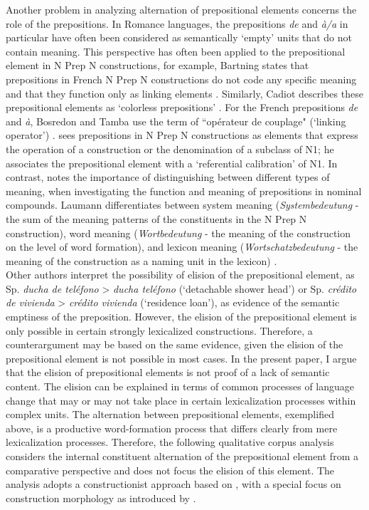 \documentclass[output=paper]{langsci/langscibook}
\begin{document}
Another problem in analyzing alternation of prepositional elements concerns the role of the prepositions. In Romance languages, the prepositions \textit{de} and \textit{à/a} in particular have often been considered as semantically `empty' units that do not contain meaning. This perspective has often been applied to the prepositional element in N Prep N constructions, for example, Bartning states that prepositions in French N Prep N constructions do not code any specific meaning and that they function only as linking elements \citep[164]{Bartning:1993}. Similarly, Cadiot describes these prepositional elements as `colorless prepositions' \citep[164]{Bartning:1993}. For the French prepositions \textit{de} and \textit{à}, Bosredon and Tamba use the term of ``opérateur de couplage" (`linking operator') \citep[44]{Bosredon:1991}. \citet{Cadiot:1997} sees prepositions in N Prep N constructions as elements that express the operation of a construction or the denomination of a subclass of N1; he associates the prepositional element with a `referential calibration' of N1. In contrast, \citet{Laumann:1998} notes the importance of distinguishing between different types of meaning, when investigating the function and meaning of prepositions in nominal compounds. Laumann differentiates between system meaning (\textit{Systembedeutung} - the sum of the meaning patterns of the constituents in the N Prep N construction), word meaning (\textit{Wortbedeutung} - the meaning of the construction on the level of word formation), and lexicon meaning (\textit{Wortschatzbedeutung} - the meaning of the construction as a naming unit in the lexicon) \citep[32]{Laumann:1998}.\\

Other authors interpret the possibility of elision of the prepositional element, as Sp. \textit{ducha de teléfono}  > \textit{ducha teléfono} (`detachable shower head') or Sp.  \textit{crédito de vivienda} > \textit{crédito  vivienda} (`residence loan'), as evidence of the semantic emptiness of the preposition. However, the elision of the prepositional element is only possible in certain strongly lexicalized constructions. Therefore, a counterargument may be based on the same evidence, given the elision of the prepositional element is not possible in most cases. In the present paper, I argue that the elision of prepositional elements is not proof of a lack of semantic content. The elision can be explained in terms of common processes of language change that may or may not take place in certain lexicalization processes within complex units. The alternation between prepositional elements, exemplified above, is a productive word-formation process that differs clearly from mere lexicalization processes. Therefore, the following qualitative corpus analysis considers the internal constituent alternation of the prepositional element from a comparative perspective and does not focus the elision of this element. The analysis adopts a constructionist approach based on \citet{Goldberg:1995,Goldberg:2006}, with a special focus on construction morphology as introduced by \citet{Booij:2010,Booij:2015}.
\end{document}
